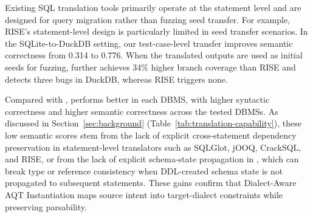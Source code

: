 \documentclass[conference]{IEEEtran}
\begin{document}
Existing SQL translation tools primarily operate at the statement level and are designed for query migration rather than fuzzing seed transfer. For example, RISE's statement-level design is particularly limited in seed transfer scenarios. In the SQLite-to-DuckDB setting, our test-case-level transfer improves semantic correctness from 0.314 to 0.776.
When the translated outputs are used as initial seeds for fuzzing, \tool{} further achieves 34\% higher branch coverage than RISE and detects three bugs in DuckDB, whereas RISE triggers none.

Compared with \sedar{}, \tool{} performs better in each DBMS, with \synatxratio{} higher syntactic correctness and \translateratio{} higher semantic correctness across the tested DBMSs.
As discussed in Section~\ref{sec:background} (Table~\ref{tab:translation-capability}), these low semantic scores stem from the lack of explicit cross-statement dependency preservation in statement-level translators such as SQLGlot, jOOQ, CrackSQL, and RISE, or from the lack of explicit schema-state propagation in \sedar{}, which can break type or reference consistency when DDL-created schema state is not propagated to subsequent statements.
These gains confirm that Dialect-Aware AQT Instantiation maps source intent into target-dialect constraints while preserving parsability.
\end{document}
